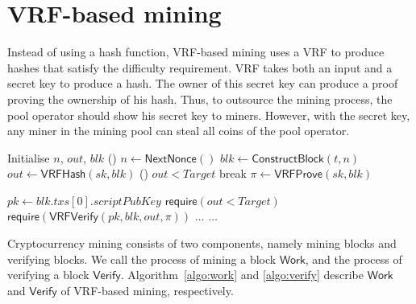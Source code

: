 \section{VRF-based mining}
\label{sec:construction}

Instead of using a hash function, VRF-based mining uses a VRF to produce hashes that satisfy the difficulty requirement.
VRF takes both an input and a secret key to produce a hash.
The owner of this secret key can produce a proof proving the ownership of his hash.
Thus, to outsource the mining process, the pool operator should show his secret key to miners.
However, with the secret key, any miner in the mining pool can steal all coins of the pool operator.

\begin{algorithm}[]
\caption{$\mathsf{Work}(sk, t, Target)$.}\label{algo:work}
\SetAlgoLined\DontPrintSemicolon
{}
  Initialise $n$, $out$, $blk$ 
  \While () {$n \gets \mathsf{NextNonce}()$}{
    $blk \gets \mathsf{ConstructBlock}(t, n)$ 
    $out \gets \mathsf{VRFHash}(sk, blk)$ 
    \If () {$out < Target$}{
      break 
    }
  }
  $\pi \gets \mathsf{VRFProve}(sk, blk)$ 
   
\end{algorithm}



\begin{algorithm}[h]
\caption{$\mathsf{Verify}(blk, out, \pi, Target)$}\label{algo:verify}
\SetAlgoLined\DontPrintSemicolon
$pk \gets blk . txs[0] . scriptPubKey$ 
$\mathsf{require}(out < Target)$ 
$\mathsf{require}(\mathsf{VRFVerify}(pk, blk, out, \pi))$ \;
$\dots$ 
$\dots$ 
\end{algorithm}

Cryptocurrency mining consists of two components, namely mining blocks and verifying blocks.
We call the process of mining a block $\mathsf{Work}$, and the process of verifying a block $\mathsf{Verify}$.
Algorithm~\ref{algo:work} and \ref{algo:verify} describe $\mathsf{Work}$ and $\mathsf{Verify}$ of VRF-based mining, respectively.

